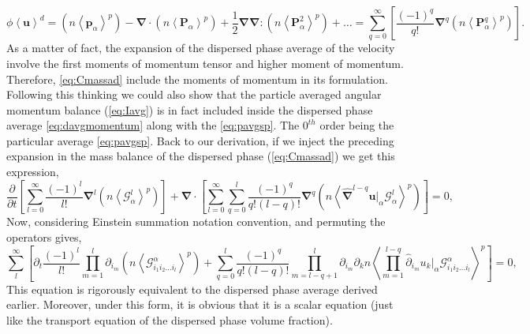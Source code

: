 \begin{equation}
    \phi\left<\bm{u}\right>^d
    =\left(n \left<\bm{p}_\alpha\right>^p\right)
    - \bm{\nabla} \cdot\left(n \left<\bm{P}_\alpha\right>^p\right)
    + \frac{1}{2}\bm{\nabla\nabla} : \left(n \left<\bm{P}_\alpha^2 \right>^p\right)
    + \ldots
    = \sum_{q=0}^\infty \left[\frac{(-1)^q}{q!} \bm{\nabla}^q \left(n \left<\bm{P}_\alpha^q\right>^p\right)  \right].
\end{equation}
As a matter of fact, the expansion of the dispersed phase average of the velocity involve the first moments of momentum tensor and higher moment of momentum.
Therefore, \ref{eq:Cmassad} include the moments of momentum in its formulation.  
Following this thinking we could also show that the particle averaged angular momentum balance (\ref{eq:Iavg}) is in fact included inside the dispersed phase average \ref{eq:davgmomentum} along with the \ref{eq:pavgsp}. 
The $0^{th}$ order being the particular average \ref{eq:pavgsp}. 
Back to our derivation,
if we inject the preceding expansion in the mass balance of the dispersed phase (\ref{eq:Cmassad}) we get this expression,
\begin{equation}
    \frac{\partial }{\partial t}\left[
        \sum_{l=0}^\infty \frac{(-1)^l}{l!}  \bm{\nabla}^l  \left(n \left<\mathcal{G}_\alpha^l\right>^p\right)
    \right]
    + \bm{\nabla}\cdot\left[
        \sum_{l=0}^\infty \sum_{q = 0}^l \frac{(-1)^q}{q!(l-q)!}  \bm{\nabla}^q  \left(n \left<\hat{\bm{\nabla}}^{l-q} \bm{u}|_\alpha \mathcal{G}_\alpha^l\right>^p\right)
    \right]
    = 0,
\end{equation}  
Now, considering Einstein summation notation convention, and permuting the operators gives,
\begin{equation}
    \sum^\infty_{l} \left[
        \partial_t
        \frac{(-1)^l}{l!}  
        \prod_{m=1}^l 
        \partial_{i_m}
        \left(
            n \left<\mathcal{G}^\alpha_{i_1i_2\ldots i_l}\right>^p
            \right) 
            +
            \sum_{q=0}^l
            \frac{(-1)^q}{q!(l-q)!}  
            \prod_{m=l-q+1}^{l} 
            \partial_{i_m}
            \partial_k 
            n \left<\prod_{m=1}^{l-q}\hat{\partial}_{i_m} u_k|_\alpha \mathcal{G}^\alpha_{i_1i_2\ldots i_l}\right>^p
    \right]
    = 0,
    \label{eq:pmavgl}
\end{equation}
This equation is rigorously equivalent to the dispersed phase average derived earlier. 
Moreover, under this form, it is obvious that it is a scalar equation (just like the transport equation of the dispersed phase volume fraction). 
